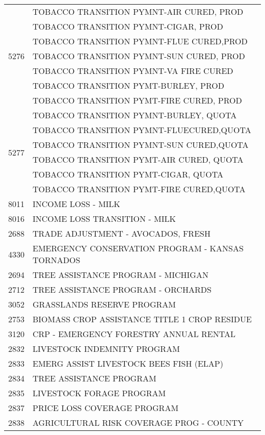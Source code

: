 \begin{longtable}{ll}
\multirow[t]{7}{*}{5276} & TOBACCO TRANSITION PYMNT-AIR CURED, PROD \\
 & TOBACCO TRANSITION PYMNT-CIGAR, PROD \\
 & TOBACCO TRANSITION PYMNT-FLUE CURED,PROD \\
 & TOBACCO TRANSITION PYMNT-SUN CURED, PROD \\
 & TOBACCO TRANSITION PYMNT-VA FIRE CURED \\
 & TOBACCO TRANSITION PYMT-BURLEY, PROD \\
 & TOBACCO TRANSITION PYMT-FIRE CURED, PROD \\
\cline{1-2}
\multirow[t]{6}{*}{5277} & TOBACCO TRANSITION PYMNT-BURLEY, QUOTA \\
 & TOBACCO TRANSITION PYMNT-FLUECURED,QUOTA \\
 & TOBACCO TRANSITION PYMNT-SUN CURED,QUOTA \\
 & TOBACCO TRANSITION PYMT-AIR CURED, QUOTA \\
 & TOBACCO TRANSITION PYMT-CIGAR, QUOTA \\
 & TOBACCO TRANSITION PYMT-FIRE CURED,QUOTA \\
\cline{1-2}
8011 & INCOME LOSS - MILK \\
\cline{1-2}
8016 & INCOME LOSS TRANSITION - MILK \\
\cline{1-2}
2688 & TRADE ADJUSTMENT - AVOCADOS, FRESH \\
\cline{1-2}
4330 & EMERGENCY CONSERVATION PROGRAM - KANSAS TORNADOS \\
\cline{1-2}
2694 & TREE ASSISTANCE PROGRAM - MICHIGAN \\
\cline{1-2}
2712 & TREE ASSISTANCE PROGRAM - ORCHARDS \\
\cline{1-2}
3052 & GRASSLANDS RESERVE PROGRAM \\
\cline{1-2}
2753 & BIOMASS CROP ASSISTANCE TITLE 1 CROP RESIDUE \\
\cline{1-2}
3120 & CRP - EMERGENCY FORESTRY ANNUAL RENTAL \\
\cline{1-2}
2832 & LIVESTOCK INDEMNITY PROGRAM \\
\cline{1-2}
2833 & EMERG ASSIST LIVESTOCK BEES FISH (ELAP) \\
\cline{1-2}
2834 & TREE ASSISTANCE PROGRAM \\
\cline{1-2}
2835 & LIVESTOCK FORAGE PROGRAM \\
\cline{1-2}
2837 & PRICE LOSS COVERAGE PROGRAM \\
\cline{1-2}
2838 & AGRICULTURAL RISK COVERAGE PROG - COUNTY \\

\end{longtable}
